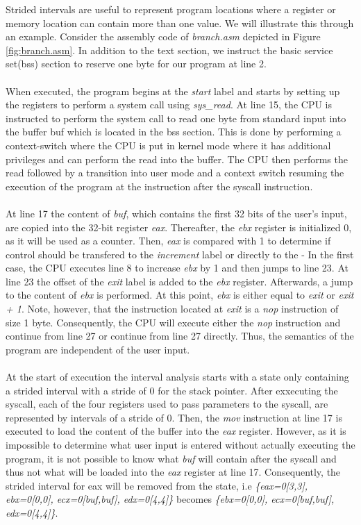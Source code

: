 \documentclass{kththesis}
\renewcommand{\it}[1]{\textit{#1}}
\begin{document}
\noindent
Strided intervals are useful to represent program locations where a register or memory location can contain more than one value. We will illustrate this through an example. Consider the assembly code of \it{branch.asm} depicted in Figure \ref{fig:branch.asm}. In addition to the text section, we instruct the basic service set(bss) section to reserve one byte for our program at line 2. 
\\ \\
When executed, the program begins at the \it{start} label and starts by setting up the registers to perform a system call using \it{sys\_read}. At line 15, the CPU is instructed to perform the system call to read one byte from standard input into the buffer buf which is located in the bss section. This is done by performing a context-switch where the CPU is put in kernel mode where it has additional privileges and can perform the read into the buffer. The CPU then performs the read followed by a transition into user mode and a context switch resuming the execution of the program at the instruction after the syscall instruction.
\\ \\ 
At line 17 the content of \it{buf}, which contains the first 32 bits of the user's input, are copied into the 32-bit register \it{eax}. Thereafter, the \it{ebx} register is initialized 0, as it will be used as a counter. Then, \it{eax} is compared with 1 to determine if control should be transfered to the \it{increment} label or directly to the \label{continue}- In the first case, the CPU executes line 8 to increase \it{ebx} by 1 and then jumps to line 23. At line 23 the offset of the \it{exit} label is added to the \it{ebx} register. Afterwards, a jump to the content of \it{ebx} is performed. At this point, \it{ebx} is either equal to \it{exit} or \it{exit + 1}. Note, however, that the instruction located at \it{exit} is a \it{nop} instruction of size 1 byte. Consequently, the CPU will execute either the \it{nop} instruction and continue from line 27 or continue from line 27 directly. Thus, the semantics of the program are independent of the user input. 
\\ \\
At the start of execution the interval analysis starts with a state only containing a strided interval with a stride of 0 for the stack pointer. After exxecuting the syscall, each of the four registers used to pass parameters to the syscall, are represented by intervals of a stride of 0. Then, the \it{mov} instruction at line 17 is executed to load the content of the buffer into the \it{eax} register. However, as it is impossible to determine what user input is entered without actually executing the program, it is not possible to know what \it{buf} will contain after the syscall and thus not what will be loaded into the \it{eax} register at line 17. Consequently, the strided interval for eax will be removed from the state, i.e \it{\{eax=0[3,3], ebx=0[0,0], ecx=0[buf,buf], edx=0[4,4]\}} becomes \it{\{ebx=0[0,0], ecx=0[buf,buf], edx=0[4,4]\}}.
\end{document}
